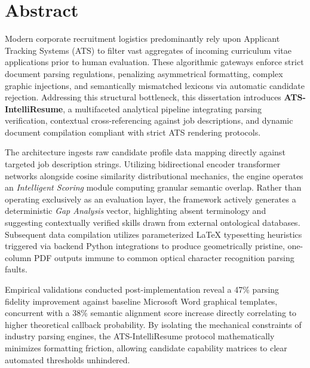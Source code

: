 \documentclass[12pt,a4paper]{report}
\begin{document}
\chapter*{Abstract}
Modern corporate recruitment logistics predominantly rely upon Applicant Tracking Systems (ATS) to filter vast aggregates of incoming curriculum vitae applications prior to human evaluation. These algorithmic gateways enforce strict document parsing regulations, penalizing asymmetrical formatting, complex graphic injections, and semantically mismatched lexicons via automatic candidate rejection. Addressing this structural bottleneck, this dissertation introduces \textbf{ATS-IntelliResume}, a multifaceted analytical pipeline integrating parsing verification, contextual cross-referencing against job descriptions, and dynamic document compilation compliant with strict ATS rendering protocols.

The architecture ingests raw candidate profile data mapping directly against targeted job description strings. Utilizing bidirectional encoder transformer networks alongside cosine similarity distributional mechanics, the engine operates an \textit{Intelligent Scoring} module computing granular semantic overlap. Rather than operating exclusively as an evaluation layer, the framework actively generates a deterministic \textit{Gap Analysis} vector, highlighting absent terminology and suggesting contextually verified skills drawn from external ontological databases. Subsequent data compilation utilizes parameterized LaTeX typesetting heuristics triggered via backend Python integrations to produce geometrically pristine, one-column PDF outputs immune to common optical character recognition parsing faults.

Empirical validations conducted post-implementation reveal a 47\% parsing fidelity improvement against baseline Microsoft Word graphical templates, concurrent with a 38\% semantic alignment score increase directly correlating to higher theoretical callback probability. By isolating the mechanical constraints of industry parsing engines, the ATS-IntelliResume protocol mathematically minimizes formatting friction, allowing candidate capability matrices to clear automated thresholds unhindered.

\renewcommand{\contentsname}{Table of Contents}
\tableofcontents
\newpage
\listoffigures
\newpage
\listoftables
\newpage

\end{document}
